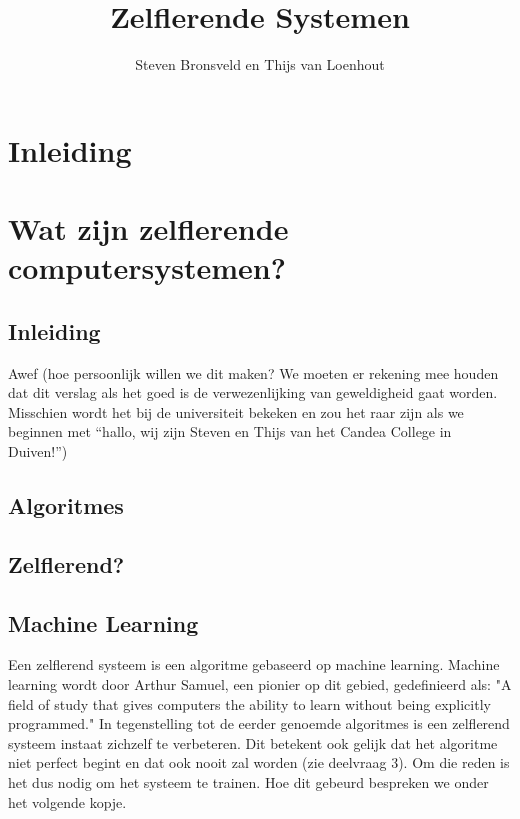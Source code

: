 \documentclass[a4paper]{article}
\title{Zelflerende Systemen}
\author{Steven Bronsveld en Thijs van Loenhout}
\begin{document}
\maketitle

\renewcommand{\contentsname}{Inhoud}

\tableofcontents

\section{Inleiding}

\section{Wat zijn zelflerende computersystemen?}



\subsection{Inleiding}
Awef (hoe persoonlijk willen we dit maken? We moeten er rekening mee houden dat dit verslag als het goed is de verwezenlijking van geweldigheid gaat worden. Misschien wordt het bij de universiteit bekeken en zou het raar zijn als we beginnen met “hallo, wij zijn Steven en Thijs van het Candea College in Duiven!”)


\subsection{Algoritmes}

\subsection{Zelflerend?}

\subsection{Machine Learning}
Een zelflerend systeem is een algoritme gebaseerd op machine learning. Machine learning wordt door Arthur Samuel, een pionier op dit gebied, gedefinieerd als:
"A field of study that gives computers the ability to learn without being explicitly programmed."  \cite{ArthurSamuel}
 In tegenstelling tot de eerder genoemde algoritmes is een zelflerend systeem instaat zichzelf te verbeteren. Dit betekent ook gelijk dat het algoritme niet perfect begint en dat ook nooit zal worden (zie deelvraag 3). Om die reden is het dus nodig om het systeem te trainen. Hoe dit gebeurd bespreken we onder het volgende kopje.
\end{document}
